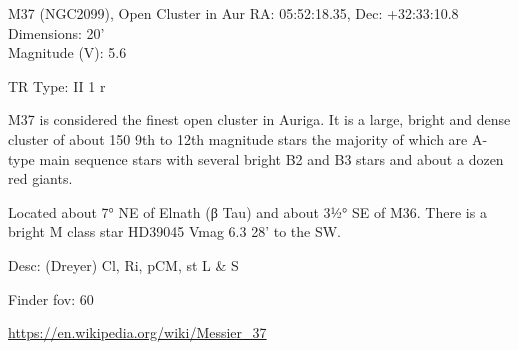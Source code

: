 \begin{block}{M37 (NGC2099), Open Cluster in Aur}
    RA: 05:52:18.35, Dec: +32:33:10.8 \\ 
    Dimensions: 20' \\ 
    Magnitude (V): 5.6

    TR Type: II 1 r

    M37 is considered the finest open cluster in Auriga. It is a large, bright
    and dense cluster of about 150 9th to 12th magnitude stars the majority of
    which are A-type main sequence stars with several bright B2 and B3 stars
    and about a dozen red giants.

    Located about 7° NE of Elnath (β Tau) and about 3½° SE of M36. There is a
    bright M class star HD39045 Vmag 6.3 28' to the SW.

    Desc: (Dreyer) Cl, Ri, pCM, st L \& S 

    Finder fov: 60 

    \url{https://en.wikipedia.org/wiki/Messier_37} 
\end{block}
